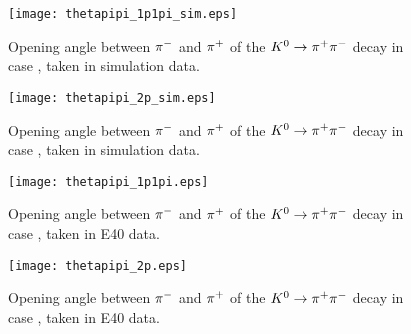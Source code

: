 \begin{figure}[!h]
  \begin{center}
    \texttt{[image: thetapipi\_1p1pi\_sim.eps]}
    \caption{Opening angle between $\pi^{-}$ and $\pi^{+}$ of the $K^0 \to \pi^+ \pi^-$ decay in case , taken in simulation data.}
    \label{fig-thetapipi_1p1pi_sim}
  \end{center}
\end{figure}

\begin{figure}[!h]
  \begin{center}
    \texttt{[image: thetapipi\_2p\_sim.eps]}
    \caption{Opening angle between $\pi^{-}$ and $\pi^{+}$ of the $K^0 \to \pi^+ \pi^-$ decay in case , taken in simulation data.}
    \label{fig-thetapipi_2p_sim}
  \end{center}
\end{figure}

\begin{figure}[!h]
  \begin{center}
    \texttt{[image: thetapipi\_1p1pi.eps]}
    \caption{Opening angle between $\pi^{-}$ and $\pi^{+}$ of the $K^0 \to \pi^+ \pi^-$ decay in case , taken in E40 data.}
    \label{fig-thetapipi_1p1pi}
  \end{center}
\end{figure}

\begin{figure}[!h]
  \begin{center}
    \texttt{[image: thetapipi\_2p.eps]}
    \caption{Opening angle between $\pi^{-}$ and $\pi^{+}$ of the $K^0 \to \pi^+ \pi^-$ decay in case , taken in E40 data.}
    \label{fig-thetapipi_2p}
  \end{center}
\end{figure}


